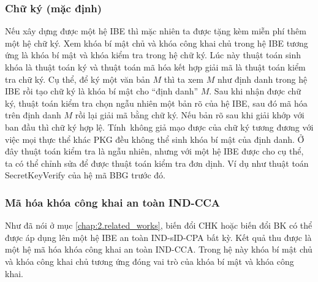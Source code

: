 \documentclass[class=report, crop=false]{standalone}
\begin{document}
			\subsubsection{Chữ ký (mặc định)}
				\vspace{-0.5\baselineskip}
				Nếu xây dựng được một hệ IBE thì mặc nhiên ta được tặng kèm miễn phí thêm một hệ chữ ký. Xem khóa bí mật chủ và khóa công khai chủ trong hệ IBE tương ứng là khóa bí mật và khóa kiểm tra trong hệ chữ ký. Lúc này thuật toán sinh khóa là thuật toán ký và thuật toán mã hóa kết hợp giải mã là thuật toán kiểm tra chữ ký. Cụ thể, để ký một văn bản $M$ thì ta xem $M$ như định danh trong hệ IBE rồi tạo chữ ký là khóa bí mật cho ``định danh'' $M$. Sau khi nhận được chữ ký, thuật toán kiểm tra chọn ngẫu nhiên một bản rõ của hệ IBE, sau đó mã hóa trên định danh $M$ rồi lại giải mã bằng chữ ký. Nếu bản rõ sau khi giải khớp với ban đầu thì chữ ký hợp lệ. Tính~không giả mạo được của chữ ký tương đương với việc mọi thực thể khác PKG đều không thể sinh khóa bí mật của định danh. Ở đây thuật toán kiểm tra là ngẫu nhiên, nhưng với một hệ IBE được cho cụ thể, ta có thể chỉnh sửa để được thuật toán kiểm tra đơn dịnh. Ví dụ như thuật toán \textsf{SecretKeyVerify} của hệ mã BBG trước đó.
			\vspace{-\baselineskip}
			\subsubsection{Mã hóa khóa công khai an toàn IND-CCA}
				\vspace{-0.5\baselineskip}
				Như đã nói ở mục \ref{chap:2.related_works}, biến đổi CHK hoặc biến đổi BK có thể được áp dụng lên một hệ IBE an toàn IND-sID-CPA bất kỳ. Kết quả thu được là một hệ mã hóa khóa công khai an toàn IND-CCA. Trong hệ này khóa bí mật chủ và khóa công khai chủ tương ứng đóng vai trò của khóa bí mật và khóa công khai.
			\vspace{-\baselineskip}
\end{document}
